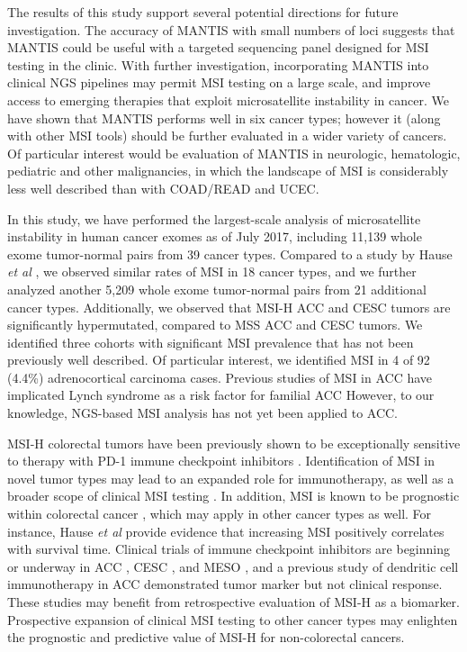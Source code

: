 The results of this study support several potential directions for future investigation. The accuracy of MANTIS with small numbers of loci suggests that MANTIS could be useful with a targeted sequencing panel designed for MSI testing in the clinic. With further investigation, incorporating MANTIS into clinical NGS pipelines may permit MSI testing on a large scale, and improve access to emerging therapies that exploit microsatellite instability in cancer. We have shown that MANTIS performs well in six cancer types; however it (along with other MSI tools) should be further evaluated in a wider variety of cancers. Of particular interest would be evaluation of MANTIS in neurologic, hematologic, pediatric and other malignancies, in which the landscape of MSI is considerably less well described than with COAD/READ and UCEC\@.

In this study, we have performed the largest-scale analysis of microsatellite instability in human cancer exomes as of July 2017, including 11,139 whole exome tumor-normal pairs from 39 cancer types. Compared to a study by Hause \textit{et al} \cite{hause2016}, we observed similar rates of MSI in 18 cancer types, and we further analyzed another 5,209 whole exome tumor-normal pairs from 21 additional cancer types. Additionally, we observed that MSI-H ACC and CESC tumors are significantly hypermutated, compared to MSS ACC and CESC tumors. We identified three cohorts with significant MSI prevalence that has not been previously well described. Of particular interest, we identified MSI in 4 of 92 (4.4\%) adrenocortical carcinoma cases. Previous studies of MSI in ACC have implicated Lynch syndrome as a risk factor for familial ACC \cite{challis2016,raymond2013} However, to our knowledge, NGS-based MSI analysis has not yet been applied to ACC\@.

MSI-H colorectal tumors have been previously shown to be exceptionally sensitive to therapy with PD-1 immune checkpoint inhibitors \cite{le2015}. Identification of MSI in novel tumor types may lead to an expanded role for immunotherapy, as well as a broader scope of clinical MSI testing \cite{dudley2016}. In addition, MSI is known to be prognostic within colorectal cancer \cite{kawakami2015}, which may apply in other cancer types as well. For instance, Hause \textit{et al} provide evidence that increasing MSI positively correlates with survival time. Clinical trials of immune checkpoint inhibitors are beginning or underway in ACC \cite{NCT02673333}, CESC \cite{NCT02635360}, and MESO \cite{NCT02784171,NCT02991482,NCT02707666,NCT02399371}, and a previous study of dendritic cell immunotherapy in ACC \cite{papewalis2006} demonstrated tumor marker but not clinical response. These studies may benefit from retrospective evaluation of MSI-H as a biomarker. Prospective expansion of clinical MSI testing to other cancer types may enlighten the prognostic and predictive value of MSI-H for non-colorectal cancers.


